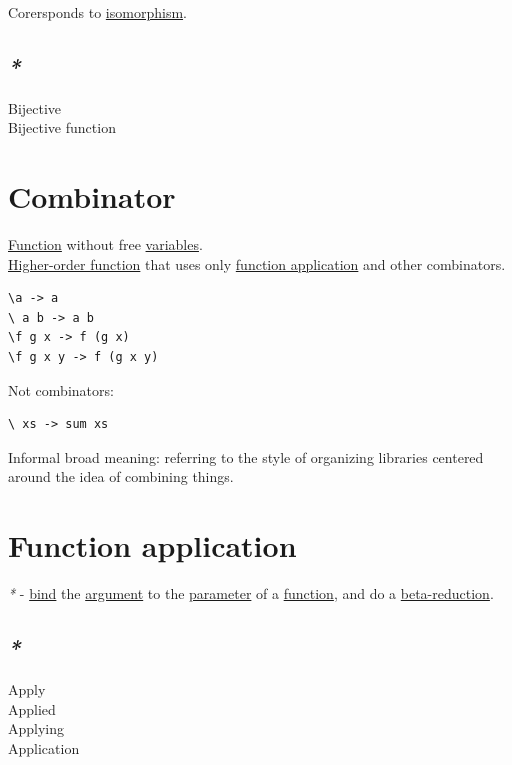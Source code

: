 \documentclass[a4paper,14pt,oneside]{book}
\begin{document}
Corersponds to \hyperref[orgc232725]{isomorphism}.\\

\subsection{\emph{*}}
\label{sec:orgcccf6fc}

\label{org933253d}Bijective\\
\label{orgb767492}Bijective function\\

\section{\label{orgacf9f9c}Combinator}
\label{sec:org50be167}
\hyperref[org9530a6b]{Function} without free \hyperref[org0f938c0]{variables}.\\
\hyperref[org3c33015]{Higher-order function} that uses only \hyperref[orgb408abd]{function application} and other combinators.\\

\begin{verbatim}
\a -> a
\ a b -> a b
\f g x -> f (g x)
\f g x y -> f (g x y)
\end{verbatim}

Not combinators:\\
\begin{verbatim}
\ xs -> sum xs
\end{verbatim}
Informal broad meaning: referring to the style of organizing libraries centered around the idea of combining things.\\

\section{\label{orgb408abd}Function application}
\label{sec:org530202a}
\emph{*} - \hyperref[orgec29b54]{bind} the \hyperref[org86f3f7b]{argument} to the \hyperref[orgd362766]{parameter} of a \hyperref[org9530a6b]{function}, and do a \hyperref[org7a5a6e0]{beta-reduction}.\\

\subsection{\emph{*}}
\label{sec:org559e8f9}

\label{org70d123a}Apply\\
\label{org4e3dfe3}Applied\\
\label{orgb099934}Applying\\
\label{orgf3301f1}Application\\
\end{document}
